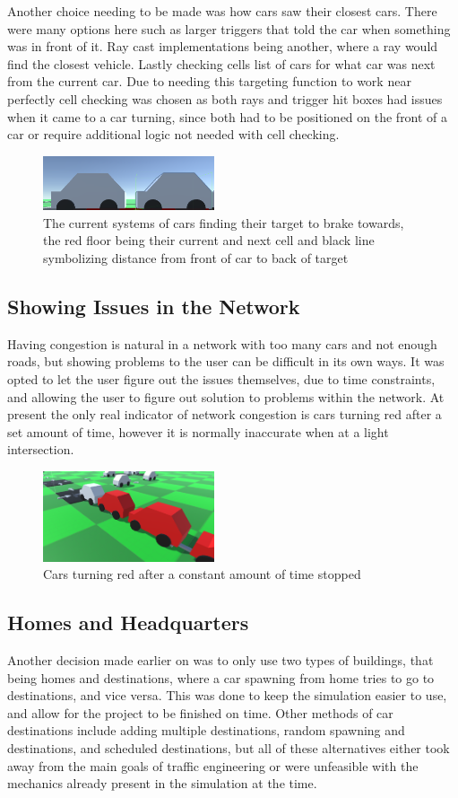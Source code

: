 \documentclass[10pt,twocolumn]{article}
\begin{document}
Another choice needing to be made was how cars saw their closest cars. There were many options here such as larger triggers that told the car when something was in front of it. Ray cast implementations being another, where a ray would find the closest vehicle. Lastly checking cells list of cars for what car was next from the current car. Due to needing this targeting function to work near perfectly cell checking was chosen as both rays and trigger hit boxes had issues when it came to a car turning, since both had to be positioned on the front of a car or require additional logic not needed with cell checking. 
\begin{figure}[h]
\caption{The current systems of cars finding their target to brake towards, the red floor being their current and next cell and black line symbolizing distance from front of car to back of target}
\includegraphics[width=0.45\textwidth]{CellCheckBlackGizmo.png}
\end{figure}
\subsection{Showing Issues in the Network}
Having congestion is natural in a network with too many cars and not enough roads, but showing problems to the user can be difficult in its own ways. It was opted to let the user figure out the issues themselves, due to time constraints, and allowing the user to figure out solution to problems within the network. At present the only real indicator of network congestion is cars turning red after a set amount of time, however it is normally inaccurate when at a light intersection. 
\begin{figure}[h]
\caption{Cars turning red after a constant amount of time stopped}
\includegraphics[width=0.45\textwidth]{red.png}
\end{figure}
\subsection{Homes and Headquarters}
Another decision made earlier on was to only use two types of buildings, that being homes and destinations, where a car spawning from home tries to go to destinations, and vice versa. This was done to keep the simulation easier to use, and allow for the project to be finished on time. Other methods of car destinations include adding multiple destinations, random spawning and destinations, and scheduled destinations, but all of these alternatives either took away from the main goals of traffic engineering or were unfeasible with the mechanics already present in the simulation at the time. 
\end{document}
